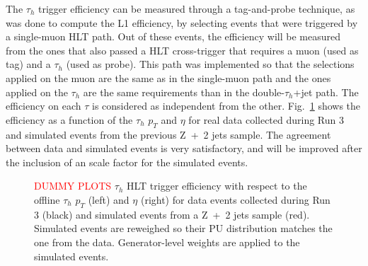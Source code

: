 \documentclass[../main.tex]{subfiles}
\begin{document}
The $\tau_h$ trigger efficiency can be measured through a tag-and-probe technique, as was done to compute the L1 efficiency, by selecting events that were triggered by a single-muon HLT path. Out of these events, the efficiency will be measured from the ones that also passed a HLT cross-trigger that requires a muon (used as tag) and a $\tau_h$ (used as probe). This path was implemented so that the selections applied on the muon are the same as in the single-muon path and the ones applied on the $\tau_h$ are the same requirements than in the double-$\tau_h$+jet path. The efficiency on each $\tau$ is considered as independent from the other. Fig.~\ref{hh:fig:hlt_eff_tau} shows the efficiency as a function of the $\tau_h$ $p_T$ and $\eta$ for real data collected during Run 3 and simulated events from the previous Z~+~2 jets sample. The agreement between data and simulated events is very satisfactory, and will be improved after the inclusion of an scale factor for the simulated events.

\begin{figure}[h!]
\begin{center}
\end{center}
\caption{\textcolor{red}{DUMMY PLOTS} $\tau_h$ HLT trigger efficiency with respect to the offline $\tau_h$ $p_T$ (left) and $\eta$ (right) for data events collected during Run 3 (black) and simulated events from a Z~+~2 jets sample (red). Simulated events are reweighed so their PU distribution matches the one from the data. Generator-level weights are applied to the simulated events.}
\label{hh:fig:hlt_eff_tau}
\end{figure}
\end{document}
